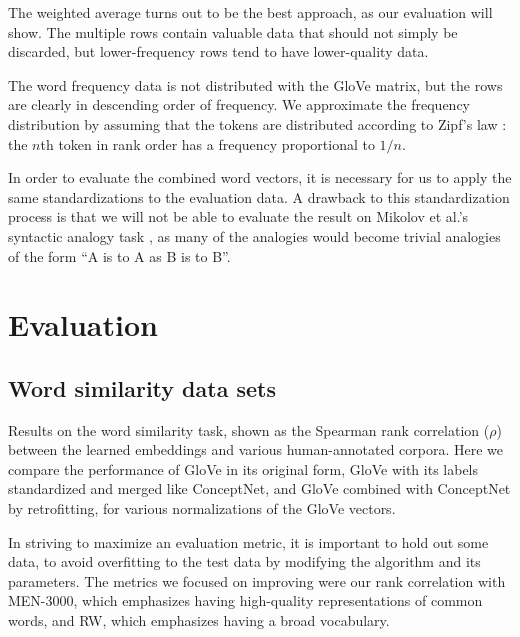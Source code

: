 \documentclass[letterpaper]{article}
\begin{document}
The weighted average turns out to be the best approach, as our evaluation will
show. The multiple rows contain valuable data that should not simply be
discarded, but lower-frequency rows tend to have lower-quality data.

The word frequency data is not distributed with the GloVe matrix, but
the rows are clearly in descending order of frequency. We approximate the
frequency distribution by assuming that the tokens are distributed according to
Zipf's law \cite{zipf1949human}: the $n$th token in rank order has a frequency
proportional to $1/n$.

In order to evaluate the combined word vectors, it is necessary for us to apply
the same standardizations to the evaluation data. A drawback to this
standardization process is that we will not be able to evaluate the result on
Mikolov et al.'s syntactic analogy task \cite{mikolov2013word2vec}, as many of
the analogies would become trivial analogies of the form
``A is to A as B is to B''.

\section{Evaluation}

\subsection{Word similarity data sets}


\begin{table*}[t]
\centering

\caption{
    Results on the word similarity task, shown as the Spearman rank correlation
    ($\rho$) between the learned embeddings and various human-annotated corpora.
    Here we compare the performance of GloVe in its original form, GloVe with
    its labels standardized and merged like ConceptNet, and GloVe combined with
    ConceptNet by retrofitting, for various normalizations of the GloVe vectors.
}
\label{eval-retro-standardize}
\end{table*}

In striving to maximize an evaluation metric, it is important to hold out some
data, to avoid overfitting to the test data by modifying the algorithm and its
parameters. The metrics we focused on improving were our rank correlation with
{\sc MEN-3000}, which emphasizes having high-quality representations of common words,
and {\sc RW}, which emphasizes having a broad vocabulary.
\end{document}

